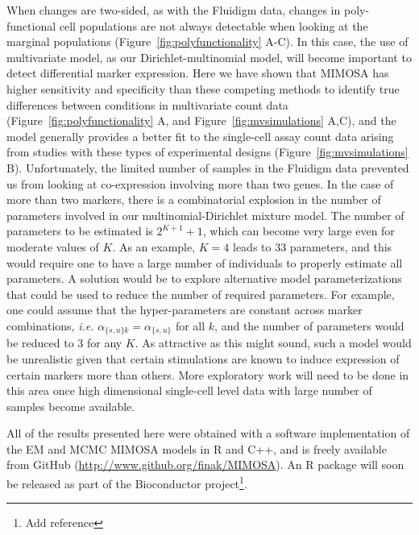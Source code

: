 \documentclass[useAMS,referee,usenatbib]{biom}
\begin{document}
When changes are two-sided, as with the Fluidigm data, changes in poly-functional cell populations are not always detectable when looking at the marginal populations (Figure~\ref{fig:polyfunctionality} A-C). 
In this case, the use of multivariate model, as our Dirichlet-multinomial model, will become important to detect differential marker expression. 
Here we have shown that MIMOSA has higher sensitivity and specificity than these competing methods to identify true differences between conditions in multivariate count data (Figure~\ref{fig:polyfunctionality} A, and Figure~\ref{fig:mvsimulations} A,C), and the model generally provides a better fit to the single-cell assay count data arising from studies with these types of experimental designs (Figure~\ref{fig:mvsimulations} B). 
Unfortunately, the limited number of samples in the Fluidigm data prevented us from looking at co-expression involving more than two genes. 
In the case of more than two markers, there is a combinatorial explosion in the number of parameters involved in our multinomial-Dirichlet mixture model. The number of parameters to be estimated is $2^{K+1}+1$, which can become very large even for moderate values of $K$. As an example, $K=4$ leads to 33 parameters, and this would require one to have a large number of individuals to properly estimate all parameters. 
A solution would be to explore alternative model parameterizations that could be used to reduce the number of required parameters. 
For example, one could assume that the hyper-parameters are constant across marker combinations, \textit{i.e.} $\alpha_{\{s,u\}k}=\alpha_{\{s,u\}}$ for all $k$, and the number of parameters would be reduced to $3$ for any $K$. 
As attractive as this might sound, such a model would be unrealistic given that certain stimulations are known to induce expression of certain markers more than others. 
More exploratory work will need to be done in this area once high dimensional single-cell level data with large number of samples become available.

All of the results presented here were obtained with a software implementation of the EM and MCMC MIMOSA models in R and C++, and is freely available from GitHub (\url{http://www.github.org/finak/MIMOSA}). An R package will soon be released as part of the Bioconductor project\footnote{Add reference}. 
\end{document}
